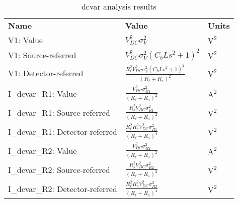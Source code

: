 \begin{table}[H]
\centering
\begin{tabular}[c]{lll}
\textbf{Name} & \textbf{Value} & \textbf{Units} \\ 
\rowcolor{myyellow}
\small{V1: Value} &$V_{DC}^{2} \sigma_{V}^{2}$ &$\mathrm{V^2}$ \\ 
\small{V1: Source-referred} &$V_{DC}^{2} \sigma_{V}^{2} \left(C_{b} L s^{2} + 1\right)^{2}$ &$\mathrm{V^2}$ \\ 
\rowcolor{myyellow}
\small{V1: Detector-referred} &$\frac{R_{\ell}^{2} V_{DC}^{2} \sigma_{V}^{2} \left(C_{b} L s^{2} + 1\right)^{2}}{\left(R_{\ell} + R_{s}\right)^{2}}$ &$\mathrm{V^2}$ \\ 
\small{I\_dcvar\_R1: Value} &$\frac{V_{DC}^{2} \sigma_{R1}^{2}}{\left(R_{\ell} + R_{s}\right)^{2}}$ &$\mathrm{A^2}$ \\ 
\rowcolor{myyellow}
\small{I\_dcvar\_R1: Source-referred} &$\frac{R_{s}^{2} V_{DC}^{2} \sigma_{R1}^{2}}{\left(R_{\ell} + R_{s}\right)^{2}}$ &$\mathrm{V^2}$ \\ 
\small{I\_dcvar\_R1: Detector-referred} &$\frac{R_{\ell}^{2} R_{s}^{2} V_{DC}^{2} \sigma_{R1}^{2}}{\left(R_{\ell} + R_{s}\right)^{4}}$ &$\mathrm{V^2}$ \\ 
\rowcolor{myyellow}
\small{I\_dcvar\_R2: Value} &$\frac{V_{DC}^{2} \sigma_{R2}^{2}}{\left(R_{\ell} + R_{s}\right)^{2}}$ &$\mathrm{A^2}$ \\ 
\small{I\_dcvar\_R2: Source-referred} &$\frac{R_{s}^{2} V_{DC}^{2} \sigma_{R2}^{2}}{\left(R_{\ell} + R_{s}\right)^{2}}$ &$\mathrm{V^2}$ \\ 
\rowcolor{myyellow}
\small{I\_dcvar\_R2: Detector-referred} &$\frac{R_{\ell}^{2} R_{s}^{2} V_{DC}^{2} \sigma_{R2}^{2}}{\left(R_{\ell} + R_{s}\right)^{4}}$ &$\mathrm{V^2}$ \\ 
\end{tabular}
\caption{dcvar analysis results}
\label{tab-dcvar}
\end{table}

